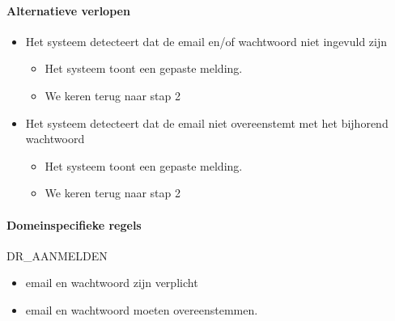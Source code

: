     \paragraph{Alternatieve verlopen}
    \begin{itemize}[nosep]
        \item[4A.] Het systeem detecteert dat de email en/of wachtwoord niet ingevuld zijn
        \begin{itemize}
            \item[4A1.] Het systeem toont een gepaste melding.
            \item[4A2.] We keren terug naar stap 2
        \end{itemize}

        \item[4B.] Het systeem detecteert dat de email niet overeenstemt met het bijhorend wachtwoord
        \begin{itemize}
            \item[4B1.] Het systeem toont een gepaste melding.
            \item[4B1.] We keren terug naar stap 2
        \end{itemize}
    \end{itemize}

    \paragraph{Domeinspecifieke regels}
    DR\_AANMELDEN
    \begin{itemize}
        \item email en wachtwoord zijn verplicht
        \item email en wachtwoord moeten overeenstemmen.
    \end{itemize}
